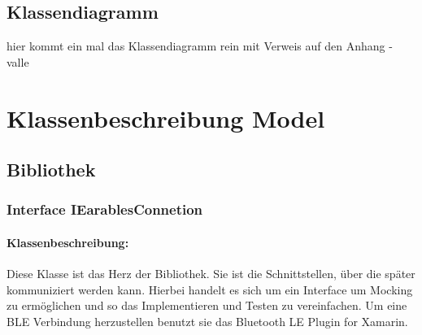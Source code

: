 \documentclass[a4paper,12pt]{article}
\begin{document}
  \subsection{Klassendiagramm}
hier kommt ein mal das Klassendiagramm rein mit Verweis auf den Anhang - valle
\clearpage
\section{Klassenbeschreibung Model}
\subsection{Bibliothek}
\subsubsection{ Interface IEarablesConnetion}

\paragraph{Klassenbeschreibung:}
Diese Klasse ist das Herz der Bibliothek. Sie ist die Schnittstellen, über die später kommuniziert werden kann. Hierbei handelt es sich um ein Interface um Mocking zu ermöglichen und so das Implementieren und Testen zu vereinfachen. Um eine BLE Verbindung herzustellen benutzt sie das \glqq Bluetooth LE Plugin for Xamarin\grqq{}.
\end{document}
